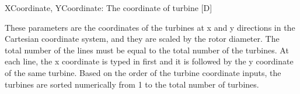\documentclass{umthesis}
\begin{document}
\noindent XCoordinate, YCoordinate: The coordinate of turbine [D]

These parameters are the coordinates of the turbines at x and y directions in the Cartesian coordinate system, and they are scaled by the rotor diameter. The total number of the lines must be equal to the total number of the turbines. At each line, the x coordinate is typed in first and it is followed by the y coordinate of the same turbine. Based on the order of the turbine coordinate inputs, the turbines are sorted numerically from 1 to the total number of turbines.



\backmatter  %



%

\end{document}
